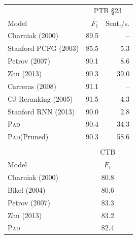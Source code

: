 \documentclass[11pt,letterpaper]{article}
\newcommand{\ParseName}{\textsc{Pad}\xspace}
\begin{document}
\begin{table}
  \centering
  \small

  \begin{tabular}{lrr}
    \toprule
    & \multicolumn{2}{c}{PTB \S 23} \\


    Model & $F_1$ & Sent./s.\\
    \midrule

    Charniak (2000)     &   89.5 &  --  \\
    Stanford PCFG (2003)     &   85.5 & 5.3  \\
    Petrov (2007)       &   90.1 & 8.6  \\
    Zhu (2013)           &   90.3 & 39.0 \\
    Carreras (2008)      &   91.1 & --    \\
    \midrule
    CJ Reranking (2005)      &   91.5 & 4.3  \\
    Stanford RNN (2013)       &   90.0 & 2.8  \\ 
    \midrule
    \ParseName        &   90.4 & 34.3 \\
    \ParseName(Pruned)        &   90.3 & 58.6 \\
    \bottomrule
    \\

    \toprule
     & \multicolumn{2}{c}{CTB} \\

    Model & \multicolumn{2}{c}{$F_1$}  \\
    \midrule
    Charniak (2000)     &   \multicolumn{2}{c}{80.8}   \\
    Bikel (2004)     &    \multicolumn{2}{c}{80.6} \\
    Petrov (2007)       &   \multicolumn{2}{c}{83.3}  \\
    Zhu (2013)           &   \multicolumn{2}{c}{83.2} \\
    \midrule
    \ParseName        &   \multicolumn{2}{c}{82.4} \\
    \bottomrule
  \end{tabular}




\end{table}
\end{document}
